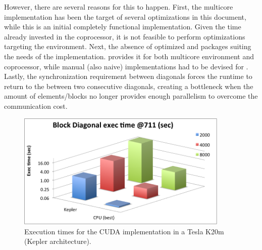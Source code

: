 \documentclass[../thesis]{subfiles}
\begin{document}
	However, there are several reasons for this to happen. First, the multicore implementation has been the target of several optimizations in this document, while this is an initial completely functional \cuda implementation. Given the time already invested in the \intel\xeonphi coprocessor, it is not feasible to perform optimizations targeting the \cuda environment. Next, the absence of optimized \blas and \lapack packages suiting the needs of the implementation. \mkl provides it for both multicore environment and coprocessor, while manual (also naive) implementations had to be devised for \cuda. Lastly, the synchronization requirement between diagonals forces the runtime to return to the \cpu between two consecutive diagonals, creating a bottleneck when the amount of elements/blocks no longer provides enough parallelism to overcome the communication cost.

	\begin{figure}[htp]
		\begin{center}
			\includegraphics[width=0.9\textwidth]{assets/images/cuda/times.png}
		\end{center}
		\caption{Execution times for the CUDA implementation in a Tesla K20m (Kepler architecture).}
		\label{fig:cuda:results:times}
	\end{figure}
\end{document}
